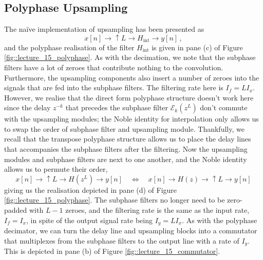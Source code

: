 \subsection{Polyphase Upsampling}
%
The na\"{i}ve implementation of upsampling has been presented as
%
\begin{displaymath}
  x[n] \longrightarrow \boxed{\uparrow L}
  \longrightarrow \boxed{H_\mathrm{int}}
  \longrightarrow y[n] \,,
\end{displaymath}
%
and the polyphase realisation of the filter $H_\mathrm{int}$ is given in
pane (c) of Figure \ref{fig::lecture_15_polyphase}. As with the decimation, we note that the subphase filters
have a lot of zeroes that contribute nothing to the convolution. Furthermore,
the upsampling components also insert a number of zeroes into the signals
that are fed into the subphase filters. The filtering rate here is $I_f = LI_x$.\\
%
However, we realise that the direct form polyphase structure doesn't work here
since the delay $z^{-k}$ that precedes the subphase filter
$\mathscr{E}_k\left(z^L\right)$ don't commute with the upsampling modules; the
Noble identity for interpolation only allows us to swap the order of subphase filter and
upsampling module. Thankfully, we recall that the transpose polyphase structure allows
us to place the delay lines that accompanies the subphase filters after the filtering.
Now the upsampling modules and subphase filters are next to one another, and the
Noble identity allows us to permute their order,
%
\begin{displaymath}
  x[n] \longrightarrow \boxed{\uparrow L}
  \longrightarrow \boxed{H\left(z^L\right)}
  \longrightarrow y[n]
  \quad\Leftrightarrow\quad
  x[n] \longrightarrow  \boxed{H\left(z\right)}
  \longrightarrow \boxed{\uparrow L}
  \longrightarrow y[n]
\end{displaymath}
%
giving us the realisation depicted in pane (d) of Figure \ref{fig::lecture_15_polyphase}.
The subphase filters no
longer need to be zero-padded with $L-1$ zeroes, and the filtering rate is the same
as the input rate, $I_f = I_x$, in spite of the output signal rate being $I_y = LI_x$.
As with the polyphase decimator, we can turn the delay line and upsampling blocks into
a commutator that multiplexes from the subphase filters to the output line with a rate
of $I_y$. This is depicted in pane (b) of Figure \ref{fig::lecture_15_commutator}.
%
